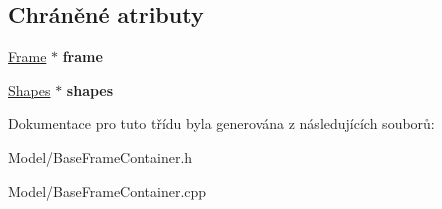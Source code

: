 \subsection*{Chráněné atributy}
\begin{DoxyCompactItemize}
\item 
\hypertarget{class_ar_pipe_1_1_base_frame_container_adae12dc85967c31c9cf79bde5c6c48b7}{\hyperlink{class_ar_pipe_1_1_frame}{Frame} $\ast$ {\bfseries frame}}\label{da/d35/class_ar_pipe_1_1_base_frame_container_adae12dc85967c31c9cf79bde5c6c48b7}

\item 
\hypertarget{class_ar_pipe_1_1_base_frame_container_a02f4d9c206cc7231c403e72d68f91396}{\hyperlink{class_ar_pipe_1_1_shapes}{Shapes} $\ast$ {\bfseries shapes}}\label{da/d35/class_ar_pipe_1_1_base_frame_container_a02f4d9c206cc7231c403e72d68f91396}

\end{DoxyCompactItemize}


Dokumentace pro tuto třídu byla generována z následujících souborů\-:\begin{DoxyCompactItemize}
\item 
Model/Base\-Frame\-Container.\-h\item 
Model/Base\-Frame\-Container.\-cpp\end{DoxyCompactItemize}
